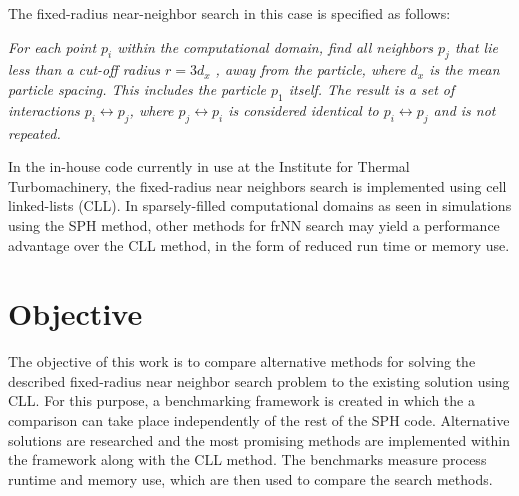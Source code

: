The fixed-radius near-neighbor search in this case is specified as follows:

{\itshape
For each point $p_i$ within the computational domain, find all neighbors $p_j$ that lie less than a cut-off radius $r = 3d_x$ , away from the particle, where $d_x$ is the mean particle spacing. This includes the particle $p_1$ itself. The result is a set of interactions $p_i \leftrightarrow p_j$, where  $p_j \leftrightarrow p_i $ is considered identical to $p_i \leftrightarrow p_j$ and is not repeated.}

In the in-house code currently in use at the Institute for Thermal Turbomachinery, the fixed-radius near neighbors search is implemented using cell linked-lists (CLL). In sparsely-filled computational domains as seen in simulations using the SPH method, other methods for frNN search may yield a performance advantage over the CLL method, in the form of reduced run time or memory use.

\section{Objective}
\label{SECTION:Objective}
The objective of this work is to compare alternative methods for solving the described fixed-radius near neighbor search problem to the existing solution using CLL. For this purpose, a benchmarking framework is created in which the a comparison can take place independently of the rest of the SPH code. Alternative solutions are researched and the most promising methods are implemented within the framework along with the CLL method. The benchmarks measure process runtime and memory use, which are then used to compare the search methods.

